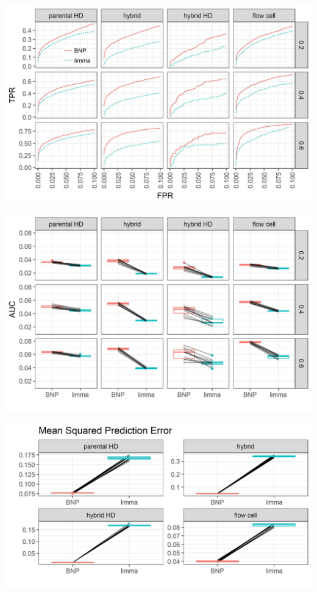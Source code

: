 \documentclass{beamer}
\begin{document}
\begin{frame}
\includegraphics[width=\textwidth]{ss1-roc}
\end{frame}

\begin{frame}
\includegraphics[width=\textwidth]{ss1-auc}
\end{frame}

\begin{frame}%
\includegraphics[width=\textheight]{ss1-mspe}
\end{frame}
\end{document}
